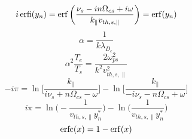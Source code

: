 \begin{equation}
	i \operatorname{erfi}(y_n) = \operatorname{erf} \bigg( \frac{\nu_s - i n\Omega_{cs} + i \omega}{k_\parallel v_{th,s,\parallel}}  \bigg) = \operatorname{erf}(y_n)
	\label{eq:a_erfiyn}
\end{equation}
\begin{equation}
	\alpha = \frac{1}{k \lambda_{D_e}}
	\label{eq:a_alpha}
\end{equation}
\begin{equation}
	\alpha^2 \frac{T_e}{T_s} = \frac{2 \omega_{ps}^2}{k^2 v_{th,s,\parallel}^2}
	\label{eq:a_alpha2}
\end{equation}
\begin{equation}
	-i\pi = \ln \Big[ \frac{k_\parallel}{i\nu_s + n\Omega_{cs} - \omega} \Big]
	- \ln \Big[ \frac{k_\parallel}{-i\nu_s - n\Omega_{cs} + \omega} \Big] 
	\label{eq:a_lnipi}
\end{equation}
\begin{equation}
	i\pi = \ln \Big( -\frac{1}{v_{th,s,\parallel}y_n^*}\Big) - \ln \Big(\frac{1}{v_{th,s,\parallel}y_n^*}\Big)
	\label{eq:a_lnipistar}
\end{equation}
\begin{equation}
	\operatorname{erfc}(x) = 1 - \operatorname{erf}(x)
	\label{eq:a_erfc}
\end{equation}

